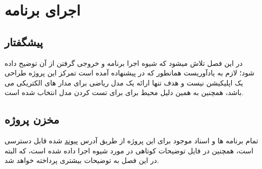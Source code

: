 \chapter{اجرای برنامه}
\section{پیشگفتار} 
در این فصل تلاش میشود که شیوه اجرا برنامه و خروجی گرفتن از آن توضیح داده شود؛
لازم به یادآوریست همانطور که در پیشنهاده آمده است تمرکز این پروژه طراحی یک اپلیکیشن نیست و هدف تنها ارائه یک مدل ریاضی برای مدار های الکتریکی می باشد، همچنین به همین دلیل محیط
برای برای تست کردن مدل انتخاب شده است.
\section{مخزن پروژه}
تمام برنامه ها و اسناد موجود برای این پروژه از طریق آدرس 
\href{https://github.com/Mehrdadghassabi/Gracc}{پیوند}
 شده قابل دسترسی است، همچنین در فایل
توضیحات کوتاهی در مورد شیوه اجرا داده شده است، که البته در این فصل به توضیحات بیشتری پرداخته خواهد شد.
